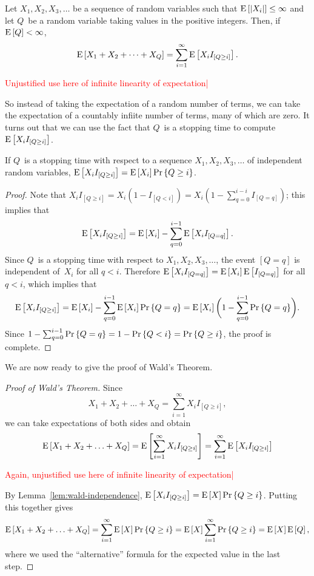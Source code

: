 \documentclass[11pt,twoside]{article}
\begin{document}
\begin{corollary}
  Let $X_1, X_2, X_3, \dots$ be a sequence of random variables such
  that $\mathop{\textup{E}}\nolimits\left[\left|X_i\right|\right] \leq \infty$ and let $Q$~be a random variable
  taking values in the positive integers.  Then, if $\mathop{\textup{E}}\nolimits\left[Q\right] < \infty$,
\[
    \mathop{\textup{E}}\nolimits\left[X_1 + X_2 + \dots + X_Q\right]
    = \sum_{i=1}^{\infty} \mathop{\textup{E}}\nolimits\left[X_i I_{[Q \geq i]}\right].
\]

\begin{editingnotes}
\textcolor{red}{Unjustified use here of infinite linearity of expectation|}
\end{editingnotes}
\end{corollary}

So instead of taking the expectation of a random number of terms, we
can take the expectation of a countably infiite number of terms, many
of which are zero.  It turns out that we can use the fact that $Q$~is a
stopping time to compute $\mathop{\textup{E}}\nolimits\left[X_i I_{[Q \geq i]}\right]$.
\begin{lemma}
  \label{lem:wald-independence}
  If $Q$~is a stopping time with respect to a sequence $X_1, X_2, X_3,
  \dots$ of independent random variables, $\mathop{\textup{E}}\nolimits\left[X_i I_{[Q \geq i]}\right]
  = \mathop{\textup{E}}\nolimits\left[X_i\right] \mathop{\textup{Pr}}\nolimits\left\{Q \geq i\right\}$.
\end{lemma}
\begin{proof}
  Note that $X_i I_{[Q \geq i]} = X_i (1-I_{[Q < i]}) = X_i (1 -
  \sum_{q=0}^{i-i}I_{[Q = q]})$; this implies that
\[
    \mathop{\textup{E}}\nolimits\left[X_i I_{[Q \geq i]}\right] =
    \mathop{\textup{E}}\nolimits\left[X_i\right] - \sum_{q=0}^{i-1} \mathop{\textup{E}}\nolimits\left[X_i I_{[Q = q]}\right].
\]
  Since $Q$~is a stopping time with respect to $X_1, X_2, X_3,
  \ldots$, the event $[Q = q]$ is independent of~$X_i$ for all $q <
  i$.  Therefore $\mathop{\textup{E}}\nolimits\left[X_i I_{[Q = q]}\right] = \mathop{\textup{E}}\nolimits\left[X_i\right] \mathop{\textup{E}}\nolimits\left[I_{[Q = q]}\right]$
  for all $q < i$, which implies that
\[
    \mathop{\textup{E}}\nolimits\left[X_i I_{[Q \geq i]}\right] =
    \mathop{\textup{E}}\nolimits\left[X_i\right] - \sum_{q=0}^{i-1} \mathop{\textup{E}}\nolimits\left[X_i\right] \mathop{\textup{Pr}}\nolimits\left\{Q = q\right\} =
    \mathop{\textup{E}}\nolimits\left[X_i\right]\biggl(1 - \sum_{q=0}^{i-1} \mathop{\textup{Pr}}\nolimits\left\{Q = q\right\}\biggr).
\]
  Since $1 - \sum_{q=0}^{i-1} \mathop{\textup{Pr}}\nolimits\left\{Q = q\right\} = 1 - \mathop{\textup{Pr}}\nolimits\left\{Q < i\right\} = \mathop{\textup{Pr}}\nolimits\left\{Q
  \geq i\right\}$, the proof is complete.
\end{proof}
We are now ready to give the proof of Wald's Theorem.
\begin{proof}[Proof of Wald's Theorem]
Since
\[
    X_1 + X_2 + \ldots + X_Q = \sum_{i=1}^{\infty} X_i I_{[Q \geq i]},
\]
we can take expectations of both sides and obtain
\[
\mathop{\textup{E}}\nolimits\left[X_1 + X_2 + \ldots + X_Q\right] = \mathop{\textup{E}}\nolimits\left[\sum_{i=1}^{\infty} X_i I_{[Q \geq i]}\right]
= \sum_{i=1}^{\infty} \mathop{\textup{E}}\nolimits\left[X_i I_{[Q \geq i]}\right]
\]

\begin{editingnotes}
\textcolor{red}{Again, unjustified use here of infinite linearity of expectation|}
\end{editingnotes}

  By Lemma~\ref{lem:wald-independence}, $\mathop{\textup{E}}\nolimits\left[X_i I_{[Q \geq i]}\right] =
  \mathop{\textup{E}}\nolimits\left[X\right] \mathop{\textup{Pr}}\nolimits\left\{Q \geq i\right\}$. Putting this together gives
\[
\mathop{\textup{E}}\nolimits\left[X_1 + X_2 + \ldots + X_Q\right]
    =  \sum_{i=1}^{\infty} \mathop{\textup{E}}\nolimits\left[X\right] \mathop{\textup{Pr}}\nolimits\left\{Q \geq i\right\}
    =  \mathop{\textup{E}}\nolimits\left[X\right] \sum_{i=1}^{\infty} \mathop{\textup{Pr}}\nolimits\left\{Q \geq i\right\}
    =  \mathop{\textup{E}}\nolimits\left[X\right] \mathop{\textup{E}}\nolimits\left[Q\right],
\]
  where we used the ``alternative'' formula for the expected value in
  the last step.
\end{proof}
\fi
\end{document}
